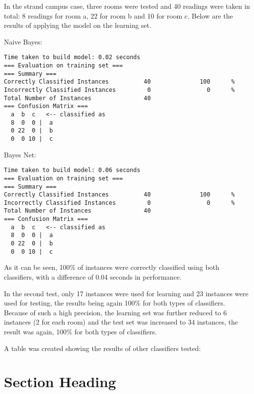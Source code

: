 In the strand campus case, three rooms were tested and 40 readings were taken in total: 8 readings for room a, 22 for room b and 10 for room c. Below are the results of applying the model on the learning set.

\noindent Naive Bayes:
\begin{lstlisting}
Time taken to build model: 0.02 seconds
=== Evaluation on training set ===
=== Summary ===
Correctly Classified Instances          40              100      %
Incorrectly Classified Instances         0                0      %
Total Number of Instances               40     
=== Confusion Matrix ===
  a  b  c   <-- classified as
  8  0  0 |  a
  0 22  0 |  b
  0  0 10 |  c
\end{lstlisting}

\noindent Bayes Net:
\begin{lstlisting}
Time taken to build model: 0.06 seconds
=== Evaluation on training set ===
=== Summary ===
Correctly Classified Instances          40              100      %
Incorrectly Classified Instances         0                0      %
Total Number of Instances               40     
=== Confusion Matrix ===
  a  b  c   <-- classified as
  8  0  0 |  a
  0 22  0 |  b
  0  0 10 |  c
\end{lstlisting}
As it can be seen, 100\% of instances were correctly classified using both classifiers, with a difference of 0.04 seconds in performance. 

In the second test, only 17 instances were used for learning and 23 instances were used for testing, the results being again 100\% for both types of classifiers. Because of such a high precision, the learning set was further reduced to 6 instances (2 for each room) and  the test set was increased to 34 instances, the result was again, 100\% for both types of classifiers.

A table was created showing the results of other classifiers tested:


\section{Section Heading}

